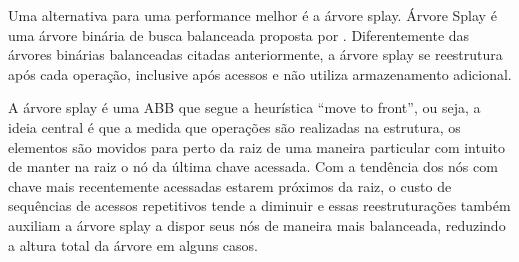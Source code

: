 Uma alternativa para uma performance melhor é a árvore splay. Árvore Splay é uma árvore binária de busca balanceada proposta por \cite{selfadjustingbst}. Diferentemente das árvores binárias balanceadas citadas anteriormente, a árvore splay se reestrutura após cada operação, inclusive após acessos e não utiliza armazenamento adicional.

A árvore splay é uma ABB que segue a heurística “move to front”, ou seja, a ideia central é que a medida que operações são realizadas na estrutura, os elementos são movidos para perto da raiz de uma maneira particular com intuito de manter na raiz o nó da última chave acessada.
Com a tendência dos nós com chave mais recentemente acessadas estarem próximos da raiz, o custo de sequências de acessos repetitivos tende a diminuir e essas reestruturações também auxiliam a árvore splay a dispor seus nós de maneira mais balanceada, reduzindo a altura total da árvore em alguns casos.

